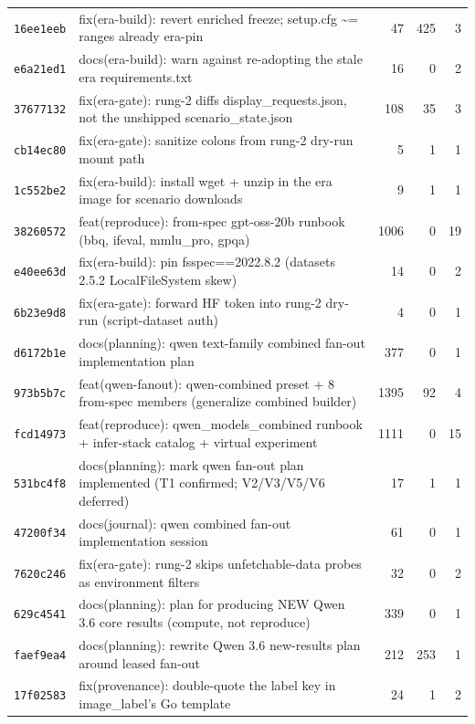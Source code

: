 \begin{longtable}{@{}p{}p{}r r r@{}}
\texttt{16ee1eeb} & fix(era-build): revert enriched freeze; setup.cfg \textasciitilde{}= ranges already era-pin & 47 & 425 & 3 \\
\texttt{e6a21ed1} & docs(era-build): warn against re-adopting the stale era requirements.txt & 16 & 0 & 2 \\
\texttt{37677132} & fix(era-gate): rung-2 diffs display\_requests.json, not the unshipped scenario\_state.json & 108 & 35 & 3 \\
\texttt{cb14ec80} & fix(era-gate): sanitize colons from rung-2 dry-run mount path & 5 & 1 & 1 \\
\texttt{1c552be2} & fix(era-build): install wget + unzip in the era image for scenario downloads & 9 & 1 & 1 \\
\texttt{38260572} & feat(reproduce): from-spec gpt-oss-20b runbook (bbq, ifeval, mmlu\_pro, gpqa) & 1006 & 0 & 19 \\
\texttt{e40ee63d} & fix(era-build): pin fsspec==2022.8.2 (datasets 2.5.2 LocalFileSystem skew) & 14 & 0 & 2 \\
\texttt{6b23e9d8} & fix(era-gate): forward HF token into rung-2 dry-run (script-dataset auth) & 4 & 0 & 1 \\
\texttt{d6172b1e} & docs(planning): qwen text-family combined fan-out implementation plan & 377 & 0 & 1 \\
\texttt{973b5b7c} & feat(qwen-fanout): qwen-combined preset + 8 from-spec members (generalize combined builder) & 1395 & 92 & 4 \\
\texttt{fcd14973} & feat(reproduce): qwen\_models\_combined runbook + infer-stack catalog + virtual experiment & 1111 & 0 & 15 \\
\texttt{531bc4f8} & docs(planning): mark qwen fan-out plan implemented (T1 confirmed; V2/V3/V5/V6 deferred) & 17 & 1 & 1 \\
\texttt{47200f34} & docs(journal): qwen combined fan-out implementation session & 61 & 0 & 1 \\
\texttt{7620c246} & fix(era-gate): rung-2 skips unfetchable-data probes as environment filters & 32 & 0 & 2 \\
\texttt{629c4541} & docs(planning): plan for producing NEW Qwen 3.6 core results (compute, not reproduce) & 339 & 0 & 1 \\
\texttt{faef9ea4} & docs(planning): rewrite Qwen 3.6 new-results plan around leased fan-out & 212 & 253 & 1 \\
\texttt{17f02583} & fix(provenance): double-quote the label key in image\_label's Go template & 24 & 1 & 2 \\
\bottomrule\end{longtable}
